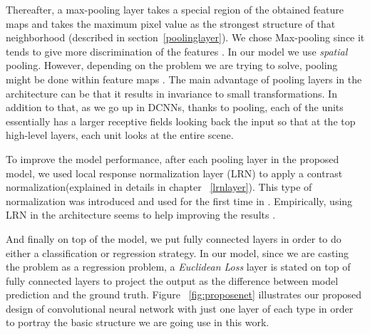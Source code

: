 \indent Thereafter, a max-pooling layer takes a special region of the obtained feature maps and takes the maximum pixel value as the strongest structure of that neighborhood (described in section~\ref{poolinglayer}). We chose Max-pooling since it tends to give more discrimination of the features \cite{boureau2010theoretical}. In our model we use \textit{spatial} pooling. However, depending on the problem we are trying to solve, pooling might be done within feature maps \cite{goodfellow2013maxout}. The main advantage of pooling layers in the architecture can be that it results in invariance to small transformations. In addition to that, as we go up in DCNNs, thanks to pooling, each of the units essentially has a larger receptive fields looking back the input so that at the top high-level layers, each unit looks at the entire scene.  

To improve the model performance, after each pooling layer in the proposed model, we used local response normalization layer (LRN) to apply a contrast normalization(explained in details in chapter ~\ref{lrnlayer}). This type of normalization was introduced and used for the first time in \cite{krizhevsky2012imagenet}. Empirically, using LRN in the architecture seems to help improving the results \cite{jarrett2009best, krizhevsky2012imagenet}. 


And finally on top of the model, we put fully connected layers in order to do either a classification or regression strategy. In our model, since we are casting the problem as a regression problem, a \textit{Euclidean Loss} layer is stated on top of fully connected layers to project the output as the difference between model prediction and the ground truth. Figure ~\ref{fig:proposenet} illustrates our proposed design of convolutional neural network with just one layer of each type in order to portray the basic structure we are going use in this work. 

